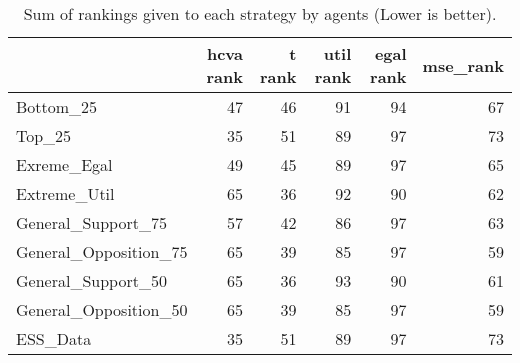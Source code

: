 \begin{table}
\caption{Sum of rankings given to each strategy by agents (Lower is better).}
\begin{tabular}{lrrrrr}
\toprule
 & hcva rank & t rank & util rank & egal rank & mse_rank \\
\midrule
Bottom_25 & 47 & 46 & 91 & 94 & 67 \\
Top_25 & 35 & 51 & 89 & 97 & 73 \\
Exreme_Egal & 49 & 45 & 89 & 97 & 65 \\
Extreme_Util & 65 & 36 & 92 & 90 & 62 \\
General_Support_75 & 57 & 42 & 86 & 97 & 63 \\
General_Opposition_75 & 65 & 39 & 85 & 97 & 59 \\
General_Support_50 & 65 & 36 & 93 & 90 & 61 \\
General_Opposition_50 & 65 & 39 & 85 & 97 & 59 \\
ESS_Data & 35 & 51 & 89 & 97 & 73 \\
\bottomrule
\end{tabular}
\end{table}
